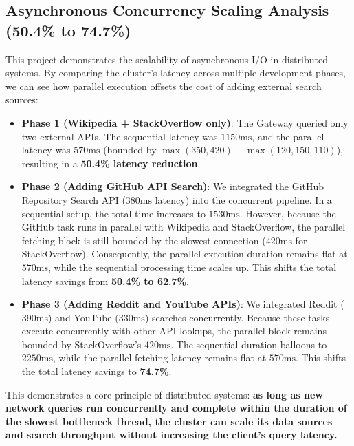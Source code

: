 \documentclass[11pt,a4paper]{article}
\begin{document}
\subsection{Asynchronous Concurrency Scaling Analysis (50.4\% to 74.7\%)}
This project demonstrates the scalability of asynchronous I/O in distributed systems. By comparing the cluster's latency across multiple development phases, we can see how parallel execution offsets the cost of adding external search sources:
\begin{itemize}
    \item \textbf{Phase 1 (Wikipedia + StackOverflow only)}:
    The Gateway queried only two external APIs. The sequential latency was $1150\text{ms}$, and the parallel latency was $570\text{ms}$ (bounded by $\max(350, 420) + \max(120, 150, 110)$), resulting in a \textbf{50.4\% latency reduction}.
    \item \textbf{Phase 2 (Adding GitHub API Search)}:
    We integrated the GitHub Repository Search API ($380\text{ms}$ latency) into the concurrent pipeline. In a sequential setup, the total time increases to $1530\text{ms}$. However, because the GitHub task runs in parallel with Wikipedia and StackOverflow, the parallel fetching block is still bounded by the slowest connection ($420\text{ms}$ for StackOverflow). Consequently, the parallel execution duration remains flat at $570\text{ms}$, while the sequential processing time scales up. This shifts the total latency savings from \textbf{50.4\% to 62.7\%}.
    \item \textbf{Phase 3 (Adding Reddit and YouTube APIs)}:
    We integrated Reddit ($390\text{ms}$) and YouTube ($330\text{ms}$) searches concurrently. Because these tasks execute concurrently with other API lookups, the parallel block remains bounded by StackOverflow's $420\text{ms}$. The sequential duration balloons to $2250\text{ms}$, while the parallel fetching latency remains flat at $570\text{ms}$. This shifts the total latency savings to \textbf{74.7\%}.
\end{itemize}
This demonstrates a core principle of distributed systems: \textbf{as long as new network queries run concurrently and complete within the duration of the slowest bottleneck thread, the cluster can scale its data sources and search throughput without increasing the client's query latency.}
\end{document}
